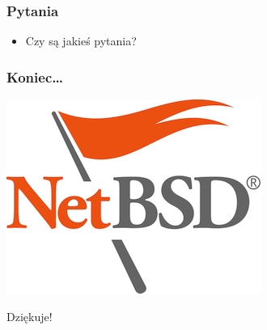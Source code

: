\documentclass[dvipsnames,table]{beamer}
\begin{document}
\begin{frame}
\frametitle{Pytania}
\begin{itemize}
	\item Czy są jakieś pytania?
\end{itemize}
\end{frame}

\begin{frame}
\frametitle{Koniec\ldots}
\vspace*{-0.8cm}
\begin{center}
\includegraphics[scale=0.5]{NetBSD.png}

Dziękuje!
\end{center}
\end{frame}

 
\end{document}
